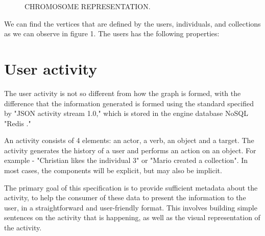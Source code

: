 \begin{figure}
\captionsetup{justification=centering,margin=2cm}
\centering
\setlength\fboxsep{0pt}
\setlength\fboxrule{0.7pt}
\caption{CHROMOSOME REPRESENTATION.}
\label{fig:chromosome}       
\end{figure}



We can find the vertices that are defined by the users, individuals, and collections as we can observe in figure 1. The users has the following properties:

\section{User activity}
The user activity is not so different from how the graph is formed, with the difference that the information generated is formed using the standard specified by "JSON activity stream 1.0," which is stored in the engine database NoSQL "Redis ."

An activity consists of 4 elements: an actor, a verb, an object and a target. The activity generates the history of a user and performs an action on an object. For example - "Christian likes the individual 3" or "Mario created a collection". In most cases, the components will be explicit, but may also be implicit.

The primary goal of this specification is to provide sufficient metadata about the activity, to help the consumer of these data to present the information to the user, in a straightforward and user-friendly format. This involves building simple sentences on the activity that is happening, as well as the visual representation of the activity.

